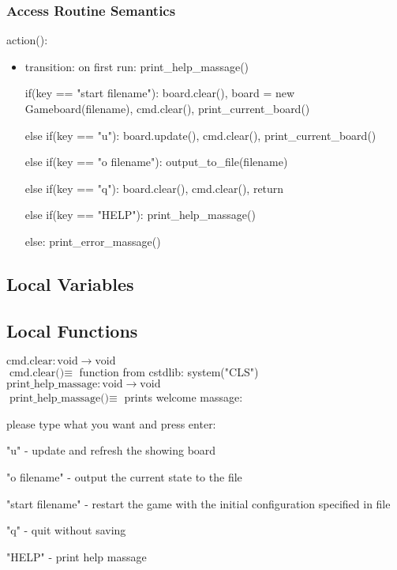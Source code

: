 \documentclass[12pt]{article}
\begin{document}
\subsubsection* {Access Routine Semantics}

action():
\begin{itemize}
\item transition: on first run: print\_help\_massage()

if(key == "start filename"): board.clear(), board = new Gameboard(filename), cmd.clear(), print\_current\_board()

else if(key == "u"): board.update(), cmd.clear(), print\_current\_board()

else if(key == "o filename"): output\_to\_file(filename)

else if(key == "q"): board.clear(), cmd.clear(), return

else if(key == "HELP"): print\_help\_massage()

else: print\_error\_massage()

\end{itemize}

\subsection*{Local Variables}

\subsection*{Local Functions}

\noindent $\text{cmd.clear} : \text{void} \rightarrow \text{void}$\\
\noindent $\text{cmd.clear()} \equiv $ function from cstdlib: system("CLS")\\


\noindent $\text{print\_help\_massage} : \text{void} \rightarrow \text{void}$\\
\noindent $\text{print\_help\_massage()} \equiv $ prints welcome massage:

please type what you want and press enter:

"u" - update and refresh the showing board

"o filename" - output the current state to the file

"start filename" - restart the game with the initial configuration specified in file

"q" - quit without saving

"HELP" - print help massage\\
\end{document}
